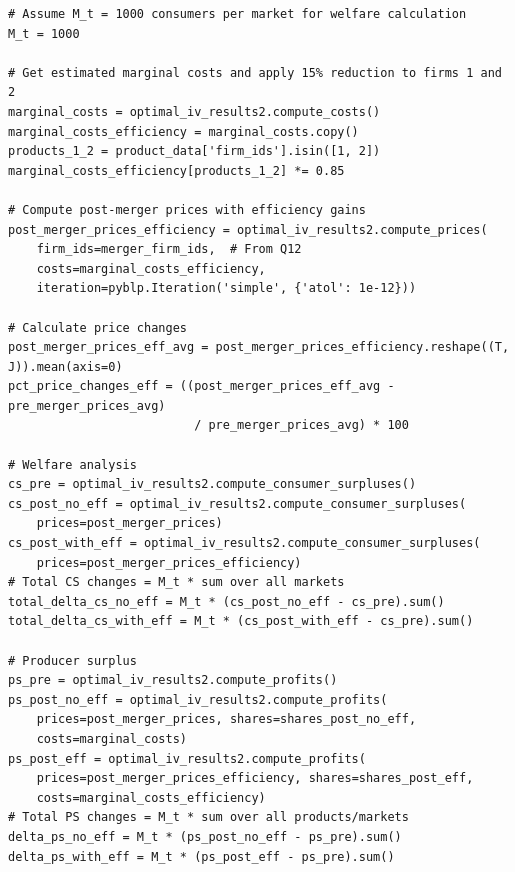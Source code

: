 \documentclass[english,11pt]{article}
\begin{document}
\begin{enumerate}
\begin{verbatim}
# Assume M_t = 1000 consumers per market for welfare calculation
M_t = 1000

# Get estimated marginal costs and apply 15% reduction to firms 1 and 2
marginal_costs = optimal_iv_results2.compute_costs()
marginal_costs_efficiency = marginal_costs.copy()
products_1_2 = product_data['firm_ids'].isin([1, 2])
marginal_costs_efficiency[products_1_2] *= 0.85

# Compute post-merger prices with efficiency gains
post_merger_prices_efficiency = optimal_iv_results2.compute_prices(
    firm_ids=merger_firm_ids,  # From Q12
    costs=marginal_costs_efficiency,
    iteration=pyblp.Iteration('simple', {'atol': 1e-12}))

# Calculate price changes
post_merger_prices_eff_avg = post_merger_prices_efficiency.reshape((T, J)).mean(axis=0)
pct_price_changes_eff = ((post_merger_prices_eff_avg - pre_merger_prices_avg) 
                          / pre_merger_prices_avg) * 100

# Welfare analysis
cs_pre = optimal_iv_results2.compute_consumer_surpluses()
cs_post_no_eff = optimal_iv_results2.compute_consumer_surpluses(
    prices=post_merger_prices)
cs_post_with_eff = optimal_iv_results2.compute_consumer_surpluses(
    prices=post_merger_prices_efficiency)
# Total CS changes = M_t * sum over all markets
total_delta_cs_no_eff = M_t * (cs_post_no_eff - cs_pre).sum()
total_delta_cs_with_eff = M_t * (cs_post_with_eff - cs_pre).sum()

# Producer surplus 
ps_pre = optimal_iv_results2.compute_profits()
ps_post_no_eff = optimal_iv_results2.compute_profits(
    prices=post_merger_prices, shares=shares_post_no_eff,
    costs=marginal_costs)
ps_post_eff = optimal_iv_results2.compute_profits(
    prices=post_merger_prices_efficiency, shares=shares_post_eff,
    costs=marginal_costs_efficiency)
# Total PS changes = M_t * sum over all products/markets
delta_ps_no_eff = M_t * (ps_post_no_eff - ps_pre).sum()
delta_ps_with_eff = M_t * (ps_post_eff - ps_pre).sum()


\end{verbatim}
\end{enumerate}
\end{document}
